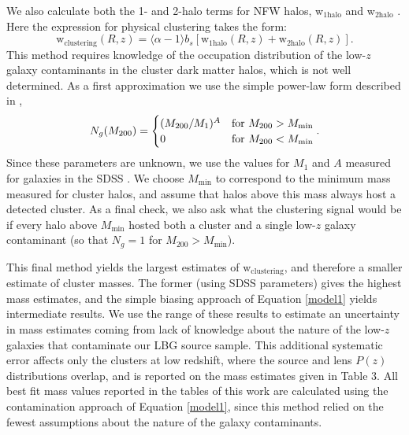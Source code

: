 We also calculate both the 1- and 2-halo terms for \ac{NFW} halos, w$_{\mathrm{1halo}}$ and w$_{\mathrm{2halo}}$ \citep[again using the code and methods described in][]{Hamana04}. Here the expression for physical clustering takes the form:
\begin{equation}
\mathrm{w}_{\mathrm{clustering}}(R,z) = \langle \alpha-1 \rangle b_{s} \left[\mathrm{w}_{\mathrm{1halo}}(R,z)+\mathrm{w}_{\mathrm{2halo}}(R,z)\right].
\end{equation}
This method requires knowledge of the occupation distribution of the low-$z$ galaxy contaminants in the cluster dark matter halos, which is not well determined. As a first approximation we use the simple power-law form described in \citet{Hamana04},
\begin{equation}
N_g(M_{200}) = \begin{cases} (M_{200}/M_1)^A & \text{for $M_{200} > M_{\mathrm{min}}$} \\ 0 & \text{for $ M_{200} < M_{\mathrm{min}}$} \end{cases}.
\end{equation}
Since these parameters are unknown, we use the values for $M_1$ and $A$ measured for galaxies in the SDSS \citep[see Table 3 of][]{Zehavi11}. We choose $M_{\mathrm{min}}$ to correspond to the minimum mass measured for cluster halos, and assume that halos above this mass always host a detected cluster. As a final check, we also ask what the clustering signal would be if every halo above $M_{\mathrm{min}}$ hosted both a cluster and a single low-$z$ galaxy contaminant (so that $N_g = 1$ for $M_{200} > M_{\mathrm{min}}$).

This final method yields the largest estimates of $\mathrm{w}_{\mathrm{clustering}}$, and therefore a smaller estimate of cluster masses. The former (using SDSS parameters) gives the highest mass estimates, and the simple biasing approach of Equation \ref{model1} yields intermediate results. We use the range of these results to estimate an uncertainty in mass estimates coming from lack of knowledge about the nature of the low-$z$ galaxies that contaminate our \ac{LBG} source sample. This additional systematic error affects only the clusters at low redshift, where the source and lens $P(z)$ distributions overlap, and is reported on the mass estimates given in Table 3. All best fit mass values reported in the tables of this work are calculated using the contamination approach of Equation \ref{model1}, since this method relied on the fewest assumptions about the nature of the galaxy contaminants.


